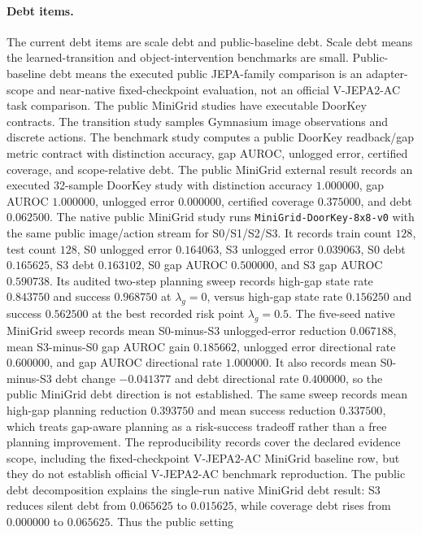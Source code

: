\paragraph{Debt items.}
The current debt items are scale debt and public-baseline debt.  Scale debt
means the learned-transition and object-intervention benchmarks are small.
Public-baseline debt means the executed public JEPA-family comparison is an
adapter-scope and near-native fixed-checkpoint evaluation, not an official
V-JEPA2-AC task comparison.
The public MiniGrid studies have executable DoorKey contracts.  The transition
study samples Gymnasium image observations and discrete actions.  The
benchmark study computes a public DoorKey readback/gap metric contract with
distinction accuracy, gap AUROC, unlogged error, certified coverage, and
scope-relative debt.  The public MiniGrid external result records an executed
32-sample DoorKey study with distinction accuracy $1.000000$, gap AUROC
$1.000000$, unlogged error $0.000000$, certified coverage $0.375000$, and
debt $0.062500$.  The native public MiniGrid study runs
\texttt{MiniGrid-DoorKey-8x8-v0} with the same public image/action stream for
S0/S1/S2/S3.  It records train count $128$, test count $128$, S0 unlogged
error $0.164063$, S3 unlogged error $0.039063$, S0 debt $0.165625$, S3 debt
$0.163102$, S0 gap AUROC $0.500000$, and S3 gap AUROC $0.590738$.  Its
audited two-step planning sweep records high-gap state rate $0.843750$ and
success $0.968750$ at $\lambda_g=0$, versus high-gap state rate $0.156250$
and success $0.562500$ at the best recorded risk point $\lambda_g=0.5$.
The five-seed native MiniGrid sweep records mean S0-minus-S3 unlogged-error
reduction $0.067188$, mean S3-minus-S0 gap AUROC gain $0.185662$, unlogged
error directional rate $0.600000$, and gap AUROC directional rate $1.000000$.  It also records
mean S0-minus-S3 debt change $-0.041377$ and debt directional rate $0.400000$, so the
public MiniGrid debt direction is not established.  The same sweep records mean
high-gap planning reduction $0.393750$ and mean success reduction $0.337500$,
which treats gap-aware planning as a risk-success tradeoff rather than a free
planning improvement.  The reproducibility records cover the declared
evidence scope, including the fixed-checkpoint V-JEPA2-AC MiniGrid baseline row,
but they do not establish official V-JEPA2-AC benchmark reproduction.
The public debt decomposition explains the single-run native MiniGrid debt
result: S3 reduces silent debt from $0.065625$ to $0.015625$, while
coverage debt rises from $0.000000$ to $0.065625$.  Thus the public setting
